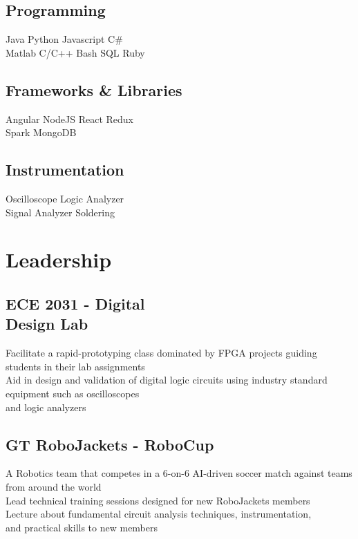 \documentclass[]{deedy-resume-openfont}
\begin{document}
\begin{minipage}[t]{0.32\textwidth}
\subsection{Programming}
Java \textbullet{} Python \textbullet{} Javascript \textbullet{} C\#\\
Matlab \textbullet{} C/C++ \textbullet{}Bash \textbullet{} SQL \textbullet{} Ruby
\sectionsep

\subsection{Frameworks \& Libraries}
Angular \textbullet{} NodeJS \textbullet{} React \textbullet{} Redux \textbullet{} \\
Spark \textbullet{} MongoDB
\sectionsep

\subsection{Instrumentation}
Oscilloscope \textbullet{}  Logic Analyzer \textbullet{} \\  Signal Analyzer \textbullet{} Soldering
\sectionsep

\section{Leadership}
\subsection{ECE 2031 - Digital \\ Design Lab}
\textbullet{} Facilitate a rapid-prototyping class dominated by FPGA projects guiding students in their lab assignments \\
\textbullet{} Aid in design and validation of digital logic circuits using industry standard equipment such as oscilloscopes \\ and logic analyzers
\sectionsep

\subsection{GT RoboJackets - RoboCup}
\textbullet{} A Robotics team that competes in a 6-on-6 AI-driven soccer match against teams from around the world \\
\textbullet{} Lead technical training sessions designed for new RoboJackets members \\
\textbullet{} Lecture about fundamental circuit analysis techniques, instrumentation, \\
and practical skills to new members 


\end{minipage}
\end{document}
